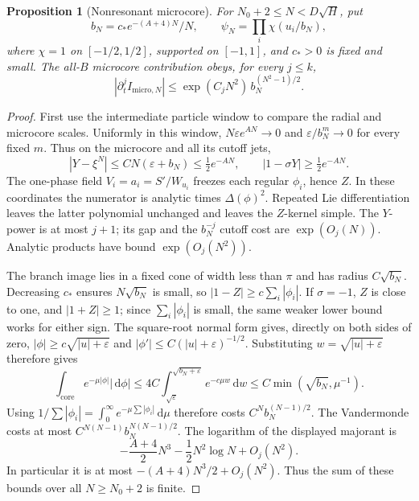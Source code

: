 \documentclass[11pt]{article}
\numberwithin{equation}{section}
\newtheorem{proposition}[theorem]{Proposition}
\theoremstyle{definition}
\newcommand{\dd}{\,\mathrm d}
\newcommand{\eps}{\varepsilon}
\begin{document}
\begin{proposition}[Nonresonant microcore]\label{prop:micro}
For \(N_0+2\le N<D\sqrt H\), put
\[
 b_N=c_*e^{-(A+4)N}/N,\qquad
 \psi_N=\prod_i\chi(u_i/b_N),
\]
where \(\chi=1\) on \([-1/2,1/2]\), supported on \([-1,1]\), and
\(c_*>0\) is fixed and small. The all-\(B\) microcore contribution
obeys, for every \(j\le k\),
\[
 |\partial_t^j I_{\mathrm{micro},N}|
 \le \exp(C_jN^2)\,b_N^{(N^2-1)/2}.
\]
\end{proposition}
\begin{proof}
First use the intermediate particle window to compare the radial and
microcore scales. Uniformly in this window,
\(N\eps e^{AN}\to0\) and \(\eps/b_N^m\to0\) for every fixed \(m\).
Thus on the microcore and all its cutoff jets,
\[
 |Y-\xi^N|\le CN(\eps+b_N)\le\tfrac12e^{-AN},
 \qquad |1-\sigma Y|\ge\tfrac12e^{-AN}.
\]
The one-phase field \(V_i=a_i=S'/W_{u_i}\) freezes each regular
\(\phi_i\), hence \(Z\). In these coordinates the numerator is
analytic times \(\Delta(\phi)^2\).
Repeated Lie differentiation leaves the latter polynomial unchanged
and leaves the \(Z\)-kernel simple. The \(Y\)-power is at most
\(j+1\); its gap and the \(b_N^{-j}\) cutoff cost are
\(\exp(O_j(N))\). Analytic products have bound \(\exp(O_j(N^2))\).

The branch image lies in a fixed cone of width less than \(\pi\)
and has radius \(C\sqrt{b_N}\). Decreasing \(c_*\) ensures
\(N\sqrt{b_N}\) is small, so $|1-Z|\ge c\sum_i|\phi_i|$. If $\sigma=-1$,
$Z$ is close to one, and $|1+Z|\ge1$; since $\sum_i|\phi_i|$
is small, the same weaker lower bound works for either sign.
The square-root normal form gives, directly on both sides of zero,
\(|\phi|\ge c\sqrt{|u|+\eps}\) and
\(|\phi'|\le C(|u|+\eps)^{-1/2}\). Substituting
\(w=\sqrt{|u|+\eps}\) therefore gives
\[
 \int_{\mathrm{core}}e^{-\mu|\phi|}|\dd\phi|
       \le4C\int_{\sqrt\eps}^{\sqrt{b_N+\eps}}e^{-c\mu w}\dd w
       \le C\min(\sqrt{b_N},\mu^{-1}).
\]
Using \(1/\sum|\phi_i|=\int_0^\infty e^{-\mu\sum|\phi_i|}\dd \mu\)
therefore costs \(C^N b_N^{(N-1)/2}\).
The Vandermonde costs at most
\(C^{N(N-1)}b_N^{N(N-1)/2}\).
The logarithm of the displayed majorant is
\[
 -\frac{A+4}{2}N^3-\frac12N^2\log N+O_j(N^2).
\]
In particular it is at most \(-(A+4)N^3/2+O_j(N^2)\).
Thus the sum of these bounds over all \(N\ge N_0+2\) is finite.
\end{proof}
\end{document}
